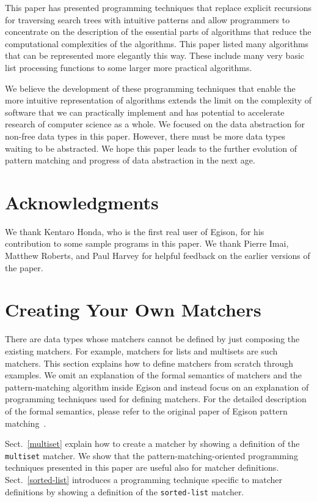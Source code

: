 \documentclass{article}
\begin{document}
This paper has presented programming techniques that replace explicit recursions for traversing search trees with intuitive patterns and allow programmers to concentrate on the description of the essential parts of algorithms that reduce the computational complexities of the algorithms.
This paper listed many algorithms that can be represented more elegantly this way.
These include many very basic list processing functions to some larger more practical algorithms.

We believe the development of these programming techniques that enable the more intuitive representation of algorithms extends the limit on the complexity of software that we can practically implement and has potential to accelerate research of computer science as a whole.
We focused on the data abstraction for non-free data types in this paper.
However, there must be more data types waiting to be abstracted.
We hope this paper leads to the further evolution of pattern matching and progress of data abstraction in the next age.

\section*{Acknowledgments}
We thank Kentaro Honda, who is the first real user of Egison, for his contribution to some sample programs in this paper.
We thank Pierre Imai, Matthew Roberts, and Paul Harvey for helpful feedback on the earlier versions of the paper.

\printbibliography

\newpage

\appendix

\section{Creating Your Own Matchers}\label{define-matchers}

There are data types whose matchers cannot be defined by just composing the existing matchers.
For example, matchers for lists and multisets are such matchers.
This section explains how to define matchers from scratch through examples.
We omit an explanation of the formal semantics of matchers and the pattern-matching algorithm inside Egison and instead focus on an explanation of programming techniques used for defining matchers.
For the detailed description of the formal semantics, please refer to the original paper of Egison pattern matching~\cite{egi2018Aplas}.

Sect.~\ref{multiset} explain how to create a matcher by showing a definition of the \texttt{multiset} matcher.
We show that the pattern-matching-oriented programming techniques presented in this paper are useful also for matcher definitions.
Sect.~\ref{sorted-list} introduces a programming technique specific to matcher definitions by showing a definition of the \texttt{sorted-list} matcher.
\end{document}
